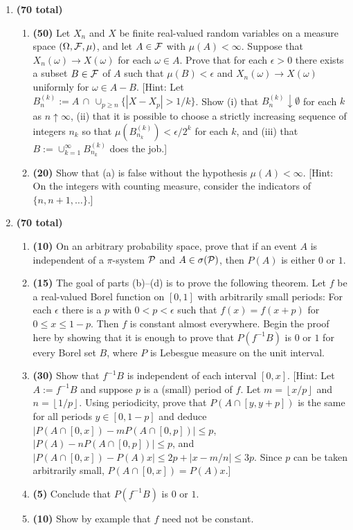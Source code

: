 \documentclass[letterpaper, 12pt]{article}
\newcommand{\Fc}{{\cal F}}
\newcommand{\Pc}{{\cal P}}
\newcommand{\lf}{\left\lfloor}
\newcommand{\rf}{\right\rfloor}
\begin{document}
\begin{enumerate}
\item {\bf (70 total)}
 \begin{enumerate}
\item {\bf (50)} Let $X_n$ and $X$ be finite real-valued random variables on a
measure space $(\Omega, \Fc, \mu)$, and let $A \in \Fc$ with $\mu(A) <
\infty$.  Suppose that $X_n(\omega) \to X(\omega)$ for each $\omega \in A$. 
Prove that for each $\epsilon > 0$ there exists a subset $B \in \Fc$ of $A$
such that $\mu(B) < \epsilon$ and $X_n(\omega) \to X(\omega)$ uniformly for
$\omega \in A - B$.  [{\sc Hint:} Let $B_n^{(k)} := A\,\cap\,\cup_{p \geq n} 
\{|X - X_p| > 1/k\}$.  Show (i) that $B_n^{(k)} \downarrow \emptyset$ 
for each $k$ as
$n \uparrow \infty$, (ii) that it is possible to choose a strictly increasing
sequence of integers $n_k$ so that $\mu(B_{n_k}^{(k)}) < \epsilon/2^k$ for each
$k$, and (iii) that $B := \cup_{k=1}^{\infty} B_{n_k}^{(k)}$ does the job.]
\item {\bf (20)}  Show that (a) is false without the hypothesis $\mu(A) <
\infty$.  [{\sc Hint:} On the integers with counting measure, consider the
indicators of 
$\{n, n+1, \ldots\}$.]   
 \end{enumerate}


\item {\bf (70 total)}
 \begin{enumerate}
\item {\bf (10)} On an arbitrary probability space, prove that if an event $A$
is independent of a $\pi$-system $\Pc$ and $A \in \sigma(\Pc)$, then $P(A)$ is
either $0$ or $1$.
\item {\bf (15)} The goal of parts (b)--(d) is to prove the
following theorem.  Let $f$ be a real-valued Borel function on $[0,1]$ with
arbitrarily small periods:  For each $\epsilon$ there is a $p$ with $0 < p <
\epsilon$ such that $f(x) = f(x + p)$ for $0 \leq x \leq 1-p$.  Then $f$ is
constant almost everywhere.  Begin the proof here by showing that it is
enough to prove that $P(f^{-1}B)$ is $0$ or $1$ for every Borel set $B$,
where $P$ is Lebesgue measure on the unit interval.
\item{\bf (30)} Show that $f^{-1}B$ is independent of each interval $[0,x]$. 
[{\sc Hint:} Let $A:= f^{-1}B$ and suppose $p$ is a (small) period of $f$.  Let
$m = \lf x/p \rf$ and $n = \lf 1/p \rf$.  Using periodicity, prove that $P(A \cap
[y,y+p])$ is the same for all periods $y \in [0,1-p]$ and deduce $|P(A \cap
[0,x]) - m P(A \cap [0,p])| \leq p$, $|P(A) - nP(A \cap [0,p])| \leq p$, and
$|P(A \cap [0,x]) - P(A)x| \leq 2p + |x - m/n| \leq 3p$.  Since $p$ can be taken
arbitrarily small, $P(A \cap [0,x]) = P(A)x$.]
\item {\bf (5)} Conclude that $P(f^{-1}B)$ is $0$ or $1$.
\item {\bf (10)} Show by example that $f$ need not be constant.
 \end{enumerate}  



\end{enumerate}
\end{document}

